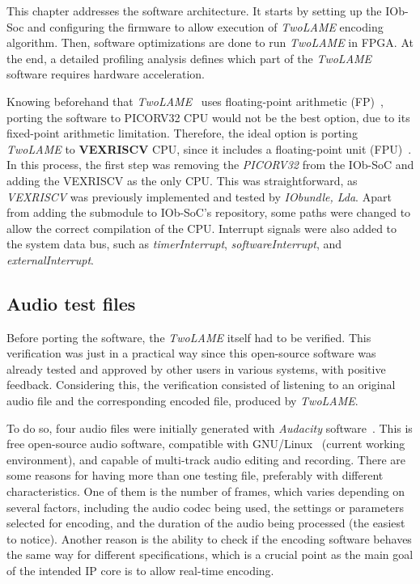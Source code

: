 This chapter addresses the software architecture.
It starts by setting up the IOb-Soc and configuring the firmware to allow execution of \textit{TwoLAME} encoding algorithm. Then, software optimizations are done to run \textit{TwoLAME} in FPGA. 
At the end, a detailed profiling analysis defines which part of the \textit{TwoLAME} software requires hardware acceleration.

Knowing beforehand that \textit{TwoLAME}~\cite{audacity} uses floating-point arithmetic (FP)~\cite{floatingpoint}, porting the software to PICORV32 CPU would not be the best option, due to its fixed-point arithmetic limitation. Therefore, the ideal option is porting \textit{TwoLAME} to \textbf{VEXRISCV} CPU, since it includes a floating-point unit (FPU)~\cite{fpu}.
In this process, the first step was removing the \textit{PICORV32} from the IOb-SoC and adding the VEXRISCV as the only CPU. This was straightforward, as \textit{VEXRISCV} was previously implemented and tested by \textit{IObundle, Lda}. Apart from adding the submodule to IOb-SoC's repository, some paths were changed to allow the correct compilation of the CPU. Interrupt signals were also added to the system data bus, such as \textit{timerInterrupt}, \textit{softwareInterrupt}, and \textit{externalInterrupt}.

\subsection{Audio test files}

Before porting the software, the \textit{TwoLAME} itself had to be verified. This verification was just in a practical way since this open-source software was already tested and approved by other users in various systems, with positive feedback. Considering this, the verification consisted of listening to an original audio file and the corresponding encoded file, produced by \textit{TwoLAME}.

To do so, four audio files were initially generated with \textit{Audacity} software~\cite{audacity}. This is free open-source audio software, compatible with GNU/Linux~\cite{gnulinux} (current working environment), and capable of multi-track audio editing and recording.
There are some reasons for having more than one testing file, preferably with different characteristics. One of them is the number of frames, which varies depending on several factors, including the audio codec being used, the settings or parameters selected for encoding, and the duration of the audio being processed (the easiest to notice). Another reason is the ability to check if the encoding software behaves the same way for different specifications, which is a crucial point as the main goal of the intended IP core is to allow real-time encoding.

